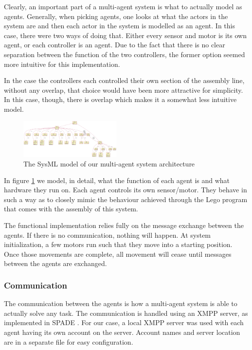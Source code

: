 \documentclass[conference]{IEEEtran}
\begin{document}
Clearly, an important part of a multi-agent system is what to actually model as agents. Generally, when picking agents, one looks at what the actors in the system are and then each actor in the system is modelled as an agent. In this case, there were two ways of doing that. Either every sensor and motor is its own agent, or each controller is an agent. Due to the fact that there is no clear separation between the function of the two controllers, the former option seemed more intuitive for this implementation.

In the case the controllers each controlled their own section of the assembly line, without any overlap, that choice would have been more attractive for simplicity. In this case, though, there is overlap which makes it a somewhat less intuitive model. 

\begin{figure}[htbp]
\centerline{\includegraphics[width=0.45\textwidth]{sysml/architecture.png}}
\caption{The SysML\cite{sysml} model of our multi-agent system architecture}
\label{architecture}
\end{figure}

In figure \ref{architecture} we model, in detail, what the function of each agent is and what hardware they run on. Each agent controls its own sensor/motor. They behave in such a way as to closely mimic the behaviour achieved through the Lego program that comes with the assembly of this system. 

The functional implementation relies fully on the message exchange between the agents. If there is no communication, nothing will happen. At system initialization, a few motors run such that they move into a starting position. Once those movements are complete, all movement will cease until messages between the agents are exchanged.

\subsubsection{Communication}

The communication between the agents is how a multi-agent system is able to actually solve any task. The communication is handled using an XMPP server, as implemented in SPADE \cite{SPADE}. For our case, a local XMPP server was used with each agent having its own account on the server. Account names and server location are in a separate file for easy configuration. 
\end{document}
